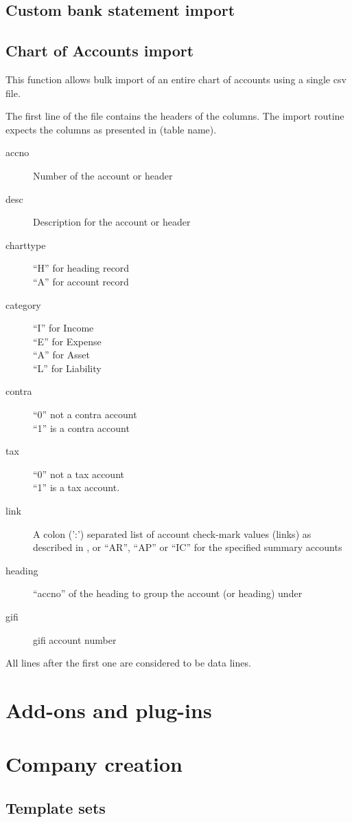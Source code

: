 \section{Custom bank statement import}
\label{sec-customization-batch-import-bank-statement}

\section{Chart of Accounts import}
\label{subsec-customization-import-coa}

This function allows bulk import of an entire chart of accounts using a
single \gls{csv} file.

The first line of the file contains the headers of the columns. The
import routine expects the columns as presented in (table name).

\begin{description}
\item [accno] Number of the account or header
\item [desc] Description for the account or header
\item [charttype] ``H'' for heading record \\
``A'' for account record
\item [category] ``I'' for Income \\
``E'' for Expense \\
``A'' for Asset \\
``L'' for Liability
\item [contra] ``0'' not a \gls{contra} account \\
``1'' is a \gls{contra} account
\item [tax] ``0'' not a tax account \\
``1'' is a tax account.
\item [link] A colon (':') separated list of account check-mark values (links) as described
    in , or ``AR'', ``AP'' or ``IC'' for the specified summary accounts
\item [heading] ``accno'' of the heading to group the account (or heading) under
\item [gifi] \gls{gifi} account number
\end{description}

All lines after the first one are considered to be data lines.

\chapter{Add-ons and plug-ins}
\label{cha-customization-add-ons}

\chapter{Company creation}
\label{cha-customization-company-creation}

\section{Template sets}
\label{sec-customization-company-creation-templates}
